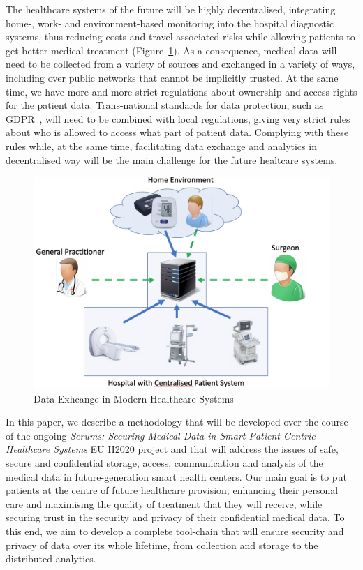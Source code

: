 \noindent
The healthcare systems of the future will be highly decentralised, integrating home-, work- and environment-based monitoring into the hospital diagnostic systems, thus reducing costs and travel-associated risks while allowing patients to get better medical treatment (Figure~\ref{fig:dataExch}). As a consequence, medical data will need to be collected from a variety of sources and exchanged in a variety of ways, including over public networks that cannot be implicitly trusted. At the same time, we have more and more strict regulations about ownership and access rights for the patient data. Trans-national standards for data protection, such as GDPR~\cite{gdpr}, will need to be combined with local regulations, giving very strict rules about who is allowed to access what part of patient data. Complying with these rules while, at the same time, facilitating data exchange and analytics in decentralised way will be the main challenge for the future healtcare systems.

\begin{figure}[h!]
    \centering
    \includegraphics[scale=0.3]{images/DataExchange.png}
    \caption{Data Exhcange in Modern Healthcare Systems}
    \label{fig:dataExch}
\end{figure}

In this paper, we describe a methodology that will be developed over the course of the ongoing \emph{Serums: Securing Medical Data in Smart Patient-Centric Healthcare Systems} EU H2020 project and that will address the issues of safe, secure and confidential storage, access, communication and analysis of the medical data in future-generation smart health centers. Our main goal is to put patients at the centre of future healthcare provision, enhancing their personal care and maximising the quality of treatment that they will receive, while securing trust in the security and privacy of their confidential medical data. To this end, we aim to develop a complete tool-chain that will ensure security and privacy of data over its whole lifetime, from collection and storage to the distributed analytics.

